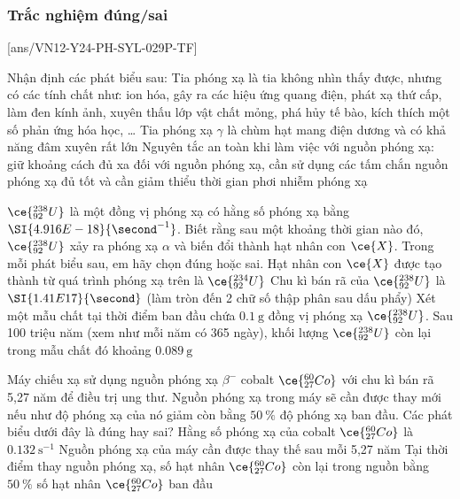 \subsubsection{Trắc nghiệm đúng/sai}
[ans/VN12-Y24-PH-SYL-029P-TF]
\setcounter{ex}{0}
\begin{ex}
	Nhận định các phát biểu sau:
	{\True Tia phóng xạ là tia không nhìn thấy được, nhưng có các tính chất như: ion hóa, gây ra các hiệu ứng quang điện, phát xạ thứ cấp, làm đen kính ảnh, xuyên thấu lớp vật chất mỏng, phá hủy tế bào, kích thích một số phản ứng hóa học, \dots}
	{Tia phóng xạ $\gamma$ là chùm hạt mang điện dương và có khả năng đâm xuyên rất lớn}
	{\True Nguyên tắc an toàn khi làm việc với nguồn phóng xạ: giữ khoảng cách đủ xa đối với nguồn phóng xạ, cần sử dụng các tấm chắn nguồn phóng xạ đủ tốt và cần giảm thiểu thời gian phơi nhiễm phóng xạ}
	\loigiai{}
\end{ex}
\begin{ex}
	$\ce{_{92}^{238}U}$ là một đồng vị phóng xạ có hằng số phóng xạ bằng $\SI{4.916E-18}{\second^{-1}}$. Biết rằng sau một khoảng thời gian nào đó, $\ce{_{92}^{238}U}$ xảy ra phóng xạ $\alpha$ và biến đổi thành hạt nhân con $\ce{X }$. Trong mỗi phát biểu sau, em hãy chọn đúng hoặc sai.
	{Hạt nhân con $\ce{X}$ được tạo thành từ quá trình phóng xạ trên là $\ce{_{92}^{234}U}$}
	{\True Chu kì bán rã của $\ce{_{92}^{238}U}$ là $\SI{1.41E17}{\second}$ (làm tròn đến 2 chữ số thập phân sau dấu phẩy)}
	{Xét một mẫu chất tại thời điểm ban đầu chứa $\SI{0.1}{\gram}$ đồng vị phóng xạ $\ce{_{92}^{238}U}$. Sau 100 triệu năm (xem như mỗi năm có 365 ngày), khối lượng $\ce{_{92}^{238}U}$ còn lại trong mẫu chất đó khoảng $\SI{0.089}{\gram}$}
	\loigiai{}
\end{ex}
\begin{ex}
	Máy chiếu xạ sử dụng nguồn phóng xạ $\beta^{-}$ cobalt $\ce{_{27}^{60}Co}$ với chu kì bán rã 5,27 năm để điều trị ung thư. Nguồn phóng xạ trong máy sẽ cần được thay mới nếu như độ phóng xạ của nó giảm còn bằng $\SI{50}{\percent}$ độ phóng xạ ban đầu. Các phát biểu dưới đây là đúng hay sai?
	{Hằng số phóng xạ của cobalt $\ce{_{27}^{60}Co}$ là $\SI{0.132}{\second^{-1}}$}
	{\True Nguồn phóng xạ của máy cần được thay thế sau mỗi 5,27 năm}
	{\True Tại thời điểm thay nguồn phóng xạ, số hạt nhân $\ce{_{27}^{60}Co}$ còn lại trong nguồn bằng $\SI{50}{\percent}$ số hạt nhân $\ce{_{27}^{60}Co}$ ban đầu}
	\loigiai{}
\end{ex}
